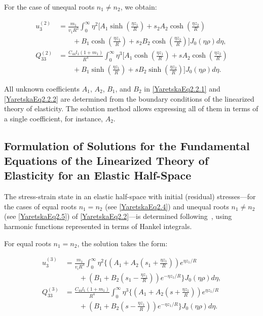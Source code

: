For the case of unequal roots $n_1 \ne n_2$, we obtain:

\begin{equation}\label{YaretskaEq2.2.2}
\begin{aligned}
	u_3^{(2)} &= \frac{m_1}{v_1 R^3} \int_0^{\infty} \eta^2 \bigg[
	A_1 \sinh\left(\frac{\eta z_1}{R} \right)
	+ s_2 A_2 \cosh\left(\frac{\eta z_2}{R} \right)
	\\
	&\qquad+ B_1 \cosh\left(\frac{\eta z_1}{R} \right)
	+ s_2 B_2 \cosh\left(\frac{\eta z_2}{R} \right)
	\bigg] J_0(\eta \rho)  d\eta,  \\
	Q_{33}^{(2)} &= \frac{C_{44} l_1 (1 + m_1)}{R^4} \int_0^{\infty} \eta^3 \bigg[
	A_1 \cosh\left(\frac{\eta z_1}{R} \right)
	+ s A_2 \cosh\left(\frac{\eta z_2}{R} \right)
	\\
	&\qquad	+ B_1 \sinh\left(\frac{\eta z_1}{R} \right)
	+ s B_2 \sinh\left(\frac{\eta z_2}{R} \right)
	\bigg] J_0(\eta \rho)  d\eta. 
\end{aligned}
\end{equation}

All unknown coefficients $A_1$, $A_2$, $B_1$, and $B_2$ in \eqref{YaretskaEq2.2.1} and \eqref{YaretskaEq2.2.2} are determined from the boundary conditions of the linearized theory of elasticity. The solution method allows expressing all of them in terms of a single coefficient, for instance, $A_2$.

\subsection{Formulation of Solutions for the Fundamental Equations of the Linearized Theory of Elasticity for an Elastic Half-Space}

The stress-strain state in an elastic half-space with initial (residual) stresses—for the cases of equal roots $n_1 = n_2$ (see \eqref{YaretskaEq2.4}) and unequal roots $n_1 \ne n_2$ (see \eqref{YaretskaEq2.5}) of \eqref{YaretskaEq2.2}—is determined following~\cite{YaretskaRef1}, using harmonic functions represented in terms of Hankel integrals.

For equal roots $n_1 = n_2$, the solution takes the form:

\begin{equation} \label{YaretskaEq2.2.3}
\begin{aligned}
	u_3^{(3)} &= \frac{m_1}{v_i R^3} \int_0^\infty \eta^2 \bigg\{
	\left( A_1 + A_2 \left( s_1 + \frac{\eta z_1}{R} \right) \right) e^{\eta z_1 / R}
	\\
	&\qquad	 +\left( B_1 + B_2 \left( s_1 - \frac{\eta z_1}{R} \right) \right) e^{-\eta z_1 / R}
	\bigg\} J_0(\eta \rho)  d\eta, \\
	Q_{33}^{(3)} &= \frac{C_{44} l_1 (1 + m_1)}{R^4} \int_0^\infty \eta^3 \bigg\{
	\left( A_1 + A_2 \left( s + \frac{\eta z_1}{R} \right) \right) e^{\eta z_1 / R} 
	\\
	&\qquad	+
	\left( B_1 + B_2 \left( s - \frac{\eta z_1}{R} \right) \right) e^{-\eta z_1 / R}
	\bigg\} J_0(\eta \rho)  d\eta. 
\end{aligned}
\end{equation}

